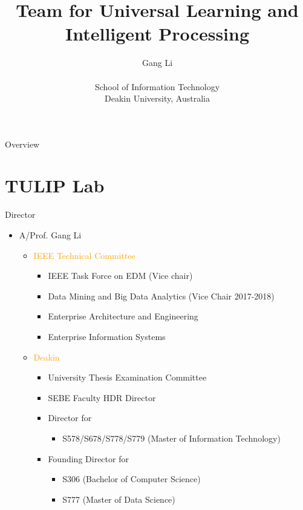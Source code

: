 \documentclass[
 size=14pt,
 paper=smartboard,  %
 mode=present, 		%
 display=slides, 	%
 pauseslide,
 fleqn,leqno]{powerdot}{}
\title{Team for Universal Learning and Intelligent Processing}
\author{
Gang Li
\\
\\School of Information Technology
\\Deakin University, Australia
}
\date{\gitCommitterDate}
\begin{document}
\maketitle



\begin{slide}[toc=,bm=]{Overview}
\tableofcontents[content=currentsection,type=1]
\end{slide}


\section{TULIP Lab}
\begin{slide}{Director}
    \begin{itemize}
      \item A/Prof. Gang Li
      \begin{itemize}
        \item \textcolor{orange}{IEEE Technical Committee}
         \begin{itemize}
           \item IEEE Task Force on EDM (Vice chair)
           \item Data Mining and Big Data Analytics (Vice Chair 2017-2018)
           \item Enterprise Architecture and Engineering
           \item Enterprise Information Systems
         \end{itemize}
        \item \textcolor{orange}{Deakin}
          \begin{itemize}
            \item University Thesis Examination Committee
            \item SEBE Faculty HDR Director
            \item Director for
                \begin{itemize}
                  \item S578/S678/S778/S779 (Master of Information Technology)
                \end{itemize}
            \item Founding Director for
                \begin{itemize}
                  \item S306 (Bachelor of Computer Science)
                  \item S777 (Master of Data Science)
                \end{itemize}
          \end{itemize}
      \end{itemize}
    \end{itemize}
\end{slide}
\end{document}
